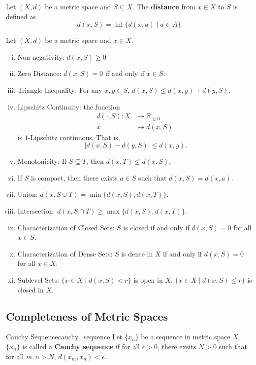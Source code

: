 \documentclass{report}
\begin{document}
\begin{definition}{}{}
	Let $(X,d)$ be a metric space and $S\subseteq X$. The \textbf{distance} from $x\in X$ to $S$ is defined as
	\[
	d(x,S) = \inf\{d(x,a)\mid a\in A\}.
	\]
\end{definition}
\begin{proposition}{}{}
	Let $(X,d)$ be a metric space and $x\in X$.
	\begin{enumerate}[(i)]
		\item Non-negativity: $d(x, S) \ge 0$
		\item Zero Distance: $d(x,S)=0$ if and only if $x\in\overline{S}$.
		\item Triangle Inequality: For any $x,y \in S$, $d(x, S) \le d(x, y) + d(y, S)$.
		\item Lipschitz Continuity: the function
		\begin{align*}
			d(\cdot,S):X &\longrightarrow \mathbb{R}_{\ge 0} \\
			x &\longmapsto d(x,S).
		\end{align*}
		is $1$-Lipschitz continuous. That is, 
		\[
		 \left| d(x, S) - d(y, S) \right| \le d(x, y).
		\]
		\item Monotonicity: If $S \subseteq T$, then $d(x, T) \le d(x, S)$.
		\item If $S$ is compact, then there exists $a\in S$ such that $d(x,S)=d(x,a)$.
		\item Union: $d(x, S \cup T) = \min\{d(x, S), d(x, T)\}$.
		\item Intersection: $d(x, S \cap T) \geq \max\{d(x, S), d(x, T)\}$.
		\item Characterization of Closed Sets: $S$ is closed if and only if $d(x, S) = 0$ for all $x \in S$.
		\item Characterization of Dense Sets: $S$ is dense in $X$ if and only if $d(x, S) = 0$ for all $x \in X$.
		\item Sublevel Sets: $\{x \in X \mid d(x, S) < r\}$ is open in $X$. $\{x \in X \mid d(x, S) \le r\}$ is closed in $X$.
	\end{enumerate}
\end{proposition}


\subsection{Completeness of Metric Spaces}
\begin{definition}{Cauchy Sequence}{cauchy_sequence}
	Let $\{x_n\}$ be a sequence in metric space $X$. $\{x_n\}$ is called a \textbf{Cauchy sequence} if for all $\epsilon>0$, there exsits $N>0$ such that for all $m,n>N$, $d(x_m,x_n)<\epsilon$.
\end{definition}
\end{document}
